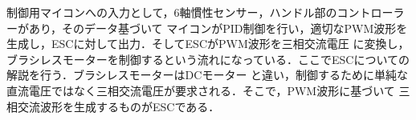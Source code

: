 \documentclass[uplatex,dvipdfmx]{jsarticle}
\begin{document}
制御用マイコンへの入力として，6軸慣性センサー，ハンドル部のコントローラーがあり，そのデータ基づいて
マイコンがPID制御を行い，適切なPWM波形を生成し，ESCに対して出力．そしてESCがPWM波形を三相交流電圧
に変換し，ブラシレスモーターを制御するという流れになっている．ここでESCについての解説を行う．ブラシレスモーターはDCモーター
と違い，制御するために単純な直流電圧ではなく三相交流電圧が要求される．そこで，PWM波形に基づいて
三相交流波形を生成するものがESCである．



\end{document}
